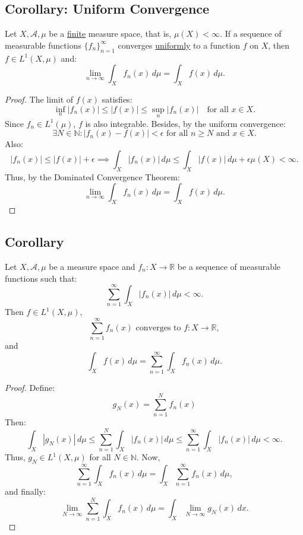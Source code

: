 \documentclass[11pt]{article}
\begin{document}
\subsection{Corollary: Uniform Convergence}
Let \(X, \mathcal{A}, \mu\) be a \underline{finite} measure space, that is, \(\mu(X) < \infty\). If a sequence of measurable functions \(\{f_n\}_{n=1}^{\infty}\) converges \underline{uniformly} to a function \(f\) on \(X\), then \(f \in L^1(X, \mu)\) and:
\[\lim_{n \to \infty} \int_X f_n(x) \,d\mu = \int_X f(x) \,d\mu.\]

\begin{proof}
The limit of \(f(x)\) satisfies:    
\[\inf_n |f_n(x)| \leq |f(x)| \leq \sup_n |f_n(x)| \quad \text{for all } x \in X.\]
Since \(f_n \in L^1(\mu)\), \(f\) is also integrable. Besides, by the uniform convergence:
\[\exists N \in \mathbb{N} : |f_n(x) - f(x)| < \epsilon \text{ for all } n \geq N \text{ and } x \in X.\]
Also:
\[|f_n(x)| \leq |f(x)| + \epsilon \implies \int_X |f_n(x)| \,d\mu \leq \int_X |f(x)| \,d\mu + \epsilon \mu(X) < \infty.\]
Thus, by the Dominated Convergence Theorem:
\[\lim_{n \to \infty} \int_X f_n(x) \,d\mu = \int_X f(x) \,d\mu.\]
\end{proof}

\subsection{Corollary}
Let \(X, \mathcal{A}, \mu\) be a measure space and \(f_n: X \to \mathbb{R}\) be a sequence of measurable functions such that:
\[\sum_{n=1}^{\infty} \int_X |f_n(x)| \,d\mu < \infty.\]
Then \(f \in L^1(X, \mu)\),
\[\sum_{n=1}^{\infty} f_n(x) \text{ converges to } f : X \to \mathbb{R},\]
and
\[\int_X f(x) \,d\mu = \sum_{n=1}^{\infty} \int_X f_n(x) \,d\mu.\]

\begin{proof}
Define:
\[g_N(x) = \sum_{n=1}^{N} f_n(x)\]
Then:
\[\int_X |g_N(x)| \,d\mu \leq \sum_{n=1}^{N} \int_X |f_n(x)| \,d\mu \leq \sum_{n=1}^{\infty} \int_X |f_n(x)| \,d\mu < \infty.\]
Thus, \(g_N \in L^1(X, \mu)\) for all \(N \in \mathbb{N}\). Now, 
\[\sum_{n=1}^{\infty} \int_X f_n(x) \,d\mu = \int_X \sum_{n=1}^{\infty} f_n(x) \,d\mu,\]
and finally:
\[\lim_{N \to \infty} \sum_{n=1}^{N} \int_X f_n(x) \,d\mu = \int_X \lim_{N \to \infty} g_N(x) \,dx.\]
\end{proof}
\end{document}
